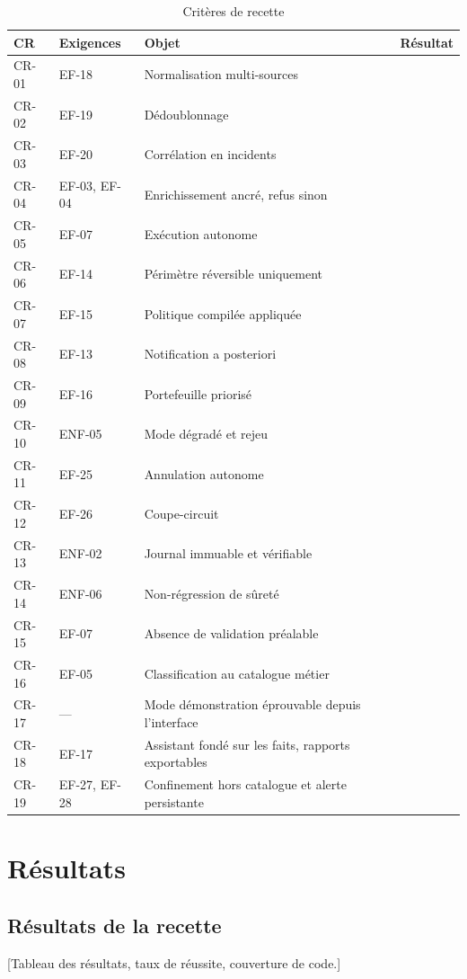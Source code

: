 \begin{table}[H]
\centering
\caption{Crit\`eres de recette}
\label{tab:criteres-recette}
\scriptsize
\begin{tabular}{@{}llp{7.6cm}c@{}}
\toprule
\textbf{CR} & \textbf{Exigences} & \textbf{Objet} & \textbf{R\'esultat} \\
\midrule
CR-01 & EF-18 & Normalisation multi-sources & \\
CR-02 & EF-19 & D\'edoublonnage & \\
CR-03 & EF-20 & Corr\'elation en incidents & \\
CR-04 & EF-03, EF-04 & Enrichissement ancr\'e, refus sinon & \\
CR-05 & EF-07 & Ex\'ecution autonome & \\
CR-06 & EF-14 & P\'erim\`etre r\'eversible uniquement & \\
CR-07 & EF-15 & Politique compil\'ee appliqu\'ee & \\
CR-08 & EF-13 & Notification a posteriori & \\
CR-09 & EF-16 & Portefeuille prioris\'e & \\
CR-10 & ENF-05 & Mode d\'egrad\'e et rejeu & \\
CR-11 & EF-25 & Annulation autonome & \\
CR-12 & EF-26 & Coupe-circuit & \\
CR-13 & ENF-02 & Journal immuable et v\'erifiable & \\
CR-14 & ENF-06 & Non-r\'egression de s\^uret\'e & \\
CR-15 & EF-07 & Absence de validation pr\'ealable & \\
CR-16 & EF-05 & Classification au catalogue m\'etier & \\
CR-17 & --- & Mode d\'emonstration \'eprouvable depuis l'interface & \\
CR-18 & EF-17 & Assistant fond\'e sur les faits, rapports exportables & \\
CR-19 & EF-27, EF-28 & Confinement hors catalogue et alerte persistante & \\
\bottomrule
\end{tabular}
\end{table}

\section{R\'esultats}
\subsection{R\'esultats de la recette}
[Tableau des r\'esultats, taux de r\'eussite, couverture de code.]

